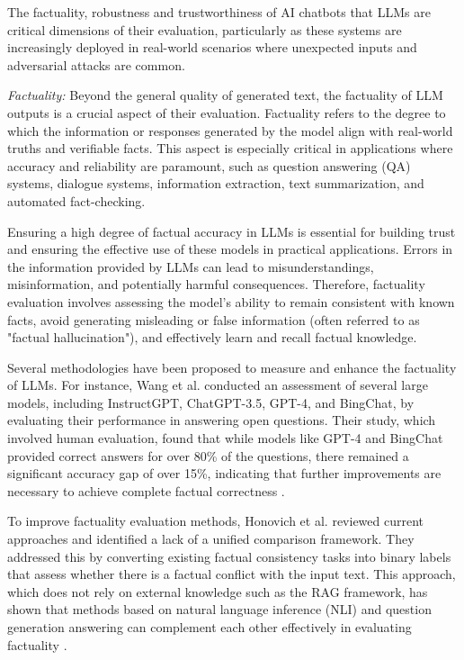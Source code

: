 
The factuality, robustness and trustworthiness of AI chatbots that LLMs are critical dimensions of their evaluation, particularly as these systems are increasingly deployed in real-world scenarios where unexpected inputs and adversarial attacks are common.

\textit{Factuality:} Beyond the general quality of generated text, the factuality of LLM outputs is a crucial aspect of their evaluation. Factuality refers to the degree to which the information or responses generated by the model align with real-world truths and verifiable facts. This aspect is especially critical in applications where accuracy and reliability are paramount, such as question answering (QA) systems, dialogue systems, information extraction, text summarization, and automated fact-checking.

Ensuring a high degree of factual accuracy in LLMs is essential for building trust and ensuring the effective use of these models in practical applications. Errors in the information provided by LLMs can lead to misunderstandings, misinformation, and potentially harmful consequences. Therefore, factuality evaluation involves assessing the model’s ability to remain consistent with known facts, avoid generating misleading or false information (often referred to as "factual hallucination"), and effectively learn and recall factual knowledge.

Several methodologies have been proposed to measure and enhance the factuality of LLMs. For instance, Wang et al. conducted an assessment of several large models, including InstructGPT, ChatGPT-3.5, GPT-4, and BingChat, by evaluating their performance in answering open questions. Their study, which involved human evaluation, found that while models like GPT-4 and BingChat provided correct answers for over 80\% of the questions, there remained a significant accuracy gap of over 15\%, indicating that further improvements are necessary to achieve complete factual correctness \cite{wang2024evaluating}.

To improve factuality evaluation methods, Honovich et al. reviewed current approaches and identified a lack of a unified comparison framework. They addressed this by converting existing factual consistency tasks into binary labels that assess whether there is a factual conflict with the input text. This approach, which does not rely on external knowledge such as the RAG framework, has shown that methods based on natural language inference (NLI) and question generation answering can complement each other effectively in evaluating factuality \cite{honovich2022true}.

